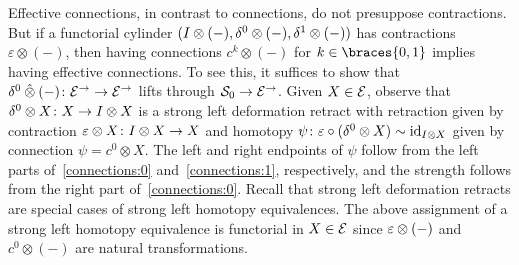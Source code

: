 \documentclass[reqno,10pt,a4paper,oneside,draft]{amsart}
\begin{document}
\begin{remark} \label{connections-are-effective}
Effective connections, in contrast to connections, do not presuppose contractions. But if a functorial cylinder 
$(I \otimes (-), \delta^0 \otimes (-), \delta^1 \otimes (-))$ has contractions $\varepsilon \otimes (-)$, then
having connections $c^k \otimes (-)$ for $k \in \braces{0, 1}$ implies having effective connections.
To see this, it suffices to show that $\delta^0 \mathbin{\hat{\otimes}} (-) \colon \mathcal{E}^\to \to \mathcal{E}^\to$ lifts through $\mathcal{S}_0 \to \mathcal{E}^\to$.
Given $X \in \mathcal{E}$, observe that $\delta^0 \otimes X \colon X \to I \otimes X$ is a strong left deformation retract with retraction given by contraction $\varepsilon \otimes X \colon I \otimes X \to X$ and homotopy $\psi \colon \varepsilon \mathbin{\circ} (\delta^0 \otimes X) \sim \operatorname{id}_{I \otimes X}$ given by connection $\psi = c^0 \otimes X$.
The left and right endpoints of $\psi$ follow from the left parts of~\eqref{connections:0} and~\eqref{connections:1}, respectively, and the strength follows from the right part of~\eqref{connections:0}.
Recall that strong left deformation retracts are special cases of strong left homotopy equivalences.
The above assignment of a strong left homotopy equivalence is functorial in $X \in \mathcal{E}$ since $\varepsilon \otimes (-)$ and $c^0 \otimes (-)$ are natural transformations.
\end{remark}
\end{document}
